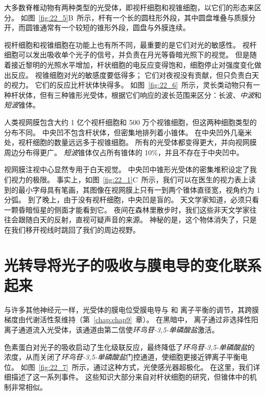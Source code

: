大多数脊椎动物有两种类型的光受体，即视杆细胞和视锥细胞，以它们的形态来区分。
如图~\ref{fig:22_5}B~所示，杆有一个长的圆柱形外段，其中圆盘堆叠与质膜分开，而圆锥通常有一个较短的锥形外段，圆盘与外膜连续。


视杆细胞和视锥细胞在功能上也有所不同，最重要的是它们对光的敏感性。
视杆细胞可以发出吸收单个光子的信号，并负责在月光等昏暗光照下的视觉。
但是随着接近黎明的光照水平增加，杆状细胞的电反应变得饱和，细胞停止对强度变化做出反应。 
视锥细胞对光的敏感度要低得多；
它们对夜视没有贡献，但只负责白天的视力。
它们的反应比杆状体快得多。
如图~\ref{fig:22_6}~所示，灵长类动物只有一种杆状体，但有三种锥形光受体，根据它们响应的波长范围来区分：长波、\textit{中波}和\textit{短波}锥体。


人类视网膜包含大约 1 亿个视杆细胞和 500 万个视锥细胞，但这两种细胞类型的分布不同。
中央凹不包含杆状体，但密集地排列着小锥体。
在中央凹外几毫米处，视杆细胞的数量远远多于视锥细胞。
所有的光受体都变得更大，并向视网膜周边分布得更广。
\textit{短波}锥体仅占所有锥体的 10\%，并且不存在于中央凹中。


视网膜注视中心显然专用于白天视觉。
中央凹中锥形光受体的密集堆积设定了我们视力的极限。
事实上，如图~\ref{fig:22_1}C~所示，我们可以在医生的视力表上读到的最小字母具有笔画，其图像在视网膜上只有一到两个锥体直径宽，视角约为 1 分弧。
到了晚上，由于没有视杆细胞，中央凹是盲的。
天文学家知道，必须只看一颗昏暗恒星的侧面才能看到它。
夜间在森林里散步时，我们这些非天文学家往往会跟随白天的反射，直视可疑声音的来源。 
神秘的是，这个物体消失了，只是在我们移开视线时跳回了我们的周边视野。



\section{光转导将光子的吸收与膜电导的变化联系起来}

与许多其他神经元一样，光受体的膜电位受膜电导与  和  离子平衡的调节，其跨膜梯度由代谢活性泵维持（第~\ref{chap:chap9}~章）。
在黑暗中， 离子通过非选择性阳离子通道流入光受体，该通道由第二信使\textit{环鸟苷-3,5-单磷酸盐}激活。


色素蛋白对光子的吸收启动了生化级联反应，最终降低了\textit{环鸟苷-3,5-单磷酸盐}的浓度，从而关闭了\textit{环鸟苷-3,5-单磷酸盐}门控通道，使细胞更接近钾离子平衡电位。
如图~\ref{fig:22_7}~所示，通过这种方式，光使感光器超极化。
在这里，我们详细描述了这一系列事件。
这些知识大部分来自对杆状细胞的研究，但锥体中的机制非常相似。


